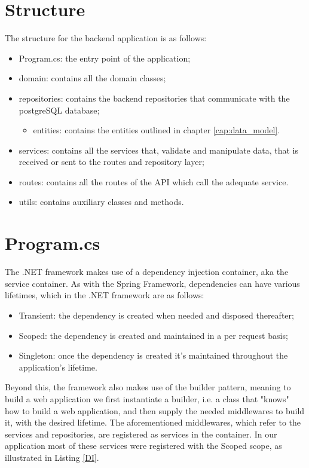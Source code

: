 \newpage

\section{Structure}

The structure for the backend application is as follows:

\begin{itemize}
	\item Program.cs: the entry point of the application;
	\item domain: contains all the domain classes;
	\item repositories: contains the backend repositories that communicate with the postgreSQL database;
	\begin{itemize}
		\item entities: contains the entities outlined in chapter \ref{cap:data_model}.
	\end{itemize}
	\item services: contains all the services that, validate and manipulate data, that is received or sent to the routes and repository layer;
	\item routes: contains all the routes of the API which call the adequate service.
	\item utils: contains auxiliary classes and methods.
\end{itemize}

\section{Program.cs}

The .NET framework makes use of a dependency injection container, aka the service container. As with the Spring Framework, dependencies can have various lifetimes, which in the .NET framework are as follows:
\begin{itemize}
	\item Transient: the dependency is created when needed and disposed thereafter;
	\item Scoped: the dependency is created and maintained in a per request basis;
	\item Singleton: once the dependency is created it's maintained throughout the application's lifetime. 
\end{itemize}
Beyond this, the framework also makes use of the builder pattern, meaning to build a web application we first instantiate a builder, i.e. a class that "knows" how to build a web application, and then supply the needed middlewares to build it, with the desired lifetime.
The aforementioned middlewares, which refer to the services and repositories, are registered as services in the container. In our application most of these services were registered with the Scoped scope, as illustrated in Listing \ref{DI}.

